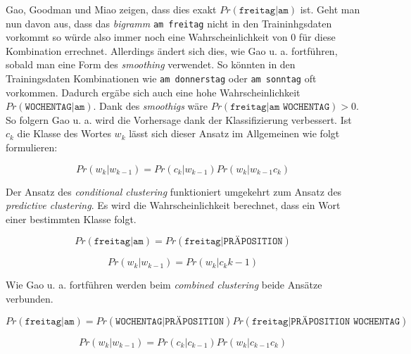    Gao, Goodman und Miao zeigen, dass dies exakt \(Pr(\texttt{freitag}|\texttt{am})\) ist. Geht man nun davon aus, dass das \emph{bigramm} \texttt{am freitag} nicht in den Traininhgsdaten vorkommt so würde also immer noch eine Wahrscheinlichkeit von 0 für diese Kombination errechnet. Allerdings ändert sich dies, wie Gao u. a. fortführen, sobald man eine Form des \emph{smoothing} verwendet. So könnten in den Trainingsdaten Kombinationen wie \texttt{am donnerstag} oder \texttt{am sonntag} oft vorkommen. Dadurch ergäbe sich auch eine hohe Wahrscheinlichkeit \(Pr(\texttt{WOCHENTAG}|\texttt{am})\). Dank des \emph{smoothigs} wäre \(Pr(\texttt{freitag}|\texttt{am WOCHENTAG}) > 0\). So folgern Gao u. a. wird die Vorhersage dank der Klassifizierung verbessert. Ist \(c_k\) die Klasse des Wortes \(w_k\) lässt sich dieser Ansatz im Allgemeinen wie folgt formulieren:
    
    \begin{equation}
   		Pr(w_k|w_{k-1}) = Pr(c_k|w_{k-1}) Pr(w_k|w_{k-1}c_k)
        \label{eq:predictive-clustering-math}
	\end{equation}
    
    Der Ansatz des \emph{conditional clustering} funktioniert  umgekehrt zum Ansatz des \emph{predictive clustering}. Es wird die Wahrscheinlichkeit berechnet, dass ein Wort einer bestimmten Klasse folgt.
    
    \begin{equation}
   		Pr(\texttt{freitag}|\texttt{am}) = Pr(\texttt{freitag}|\texttt{PRÄPOSITION})
        \label{eq:conditional-clustering-words}
	\end{equation}
    
    \begin{equation}
   		Pr(w_k|w_{k-1}) = Pr(w_k|c_k{k-1})
        \label{eq:conditional-clustering-math}
	\end{equation}
    
    Wie Gao u. a. fortführen werden beim \emph{combined clustering} beide Ansätze verbunden.
    
    \begin{equation}
   		Pr(\texttt{freitag}|\texttt{am}) = Pr(\texttt{WOCHENTAG}|\texttt{PRÄPOSITION}) Pr(\texttt{freitag}|\texttt{PRÄPOSITION WOCHENTAG})
        \label{eq:combined-clustering-words}
	\end{equation}
    
    \begin{equation}
   		Pr(w_k|w_{k-1}) = Pr(c_k|c_{k-1}) Pr(w_k|c_{k-1} c_k)
        \label{eq:combined-clustering-math}
	\end{equation}
    
